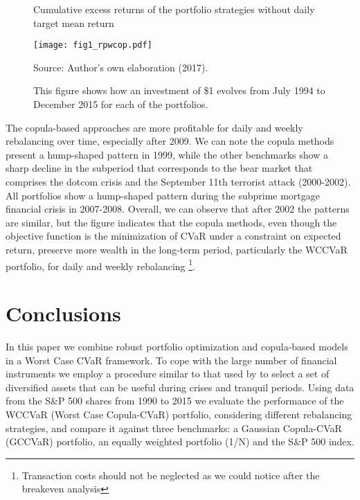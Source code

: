 \documentclass[a4paper,12pt]{report}
\begin{document}
\begin{figure}[htbp]
	\hspace*{-2cm} 
	\caption{\scriptsize Cumulative excess returns of the portfolio strategies without daily target mean return }
	\texttt{[image: fig1\_rpwcop.pdf]}
	\captionsetup{justification=raggedright,
		singlelinecheck=false
	}
	\caption*{Source: Author's own elaboration (2017).}
	\caption*{This figure shows how an investment of \$1 evolves from July 1994 to December 2015 for each of the portfolios.}
	\label{fig:fig01}
\end{figure}

The copula-based approaches are more profitable for daily and weekly rebalancing over time, especially after 2009. We can note the copula methods present a hump-shaped pattern in 1999, while the other benchmarks show a sharp decline in the subperiod that corresponds to the bear market that comprises the dotcom crisis and the September 11th terrorist attack (2000-2002). All portfolios show a hump-shaped pattern during the subprime mortgage financial crisis in 2007-2008. Overall, we can observe that after 2002 the patterns are similar, but the figure indicates that the copula methods, even though the objective function is the minimization of CVaR under a constraint on expected return, preserve more wealth in the long-term period, particularly the WCCVaR portfolio, for daily and weekly rebalancing \footnote{Transaction costs should not be neglected as we could notice after the breakeven analysis}.



\vspace{0.3cm}


\section{Conclusions}

In this paper we combine robust portfolio optimization and copula-based models in a Worst Case CVaR framework. To cope with the large number of financial instruments we employ a procedure similar to that used by \citet*{ggr06} to select a set of diversified assets that can be useful during crises and tranquil periods. Using data from the S\&P 500 shares from 1990 to 2015 we evaluate the performance of the WCCVaR (Worst Case Copula-CVaR) portfolio, considering different rebalancing strategies, and compare it against three benchmarks: a Gaussian Copula-CVaR (GCCVaR) portfolio, an equally weighted portfolio (1/N) and the S\&P 500 index. 
\end{document}
